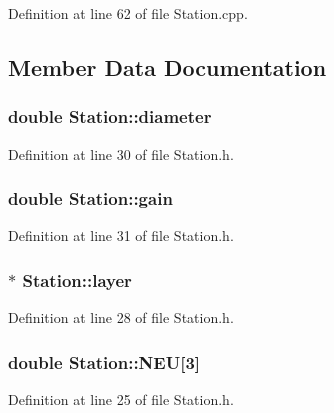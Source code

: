 Definition at line 62 of file Station.cpp.



\subsection{Member Data Documentation}
\hypertarget{classStation_aa7b65ca1b24be6b9b071097d5581054c}{
\subsubsection[{diameter}]{\setlength{\rightskip}{0pt plus 5cm}double {\bf Station::diameter}}}
\label{classStation_aa7b65ca1b24be6b9b071097d5581054c}


Definition at line 30 of file Station.h.

\hypertarget{classStation_a132660da885c826d92750aee2e469cfe}{
\subsubsection[{gain}]{\setlength{\rightskip}{0pt plus 5cm}double {\bf Station::gain}}}
\label{classStation_a132660da885c826d92750aee2e469cfe}


Definition at line 31 of file Station.h.

\hypertarget{classStation_aad67aa8d99ed867ff834ef644ef4f511}{
\subsubsection[{layer}]{$\ast$ {\bf Station::layer}}}
\label{classStation_aad67aa8d99ed867ff834ef644ef4f511}


Definition at line 28 of file Station.h.

\hypertarget{classStation_a49b5c4024685c59892989eb78167c0a2}{
\subsubsection[{NEU}]{\setlength{\rightskip}{0pt plus 5cm}double {\bf Station::NEU}\mbox{[}3\mbox{]}}}
\label{classStation_a49b5c4024685c59892989eb78167c0a2}


Definition at line 25 of file Station.h.

